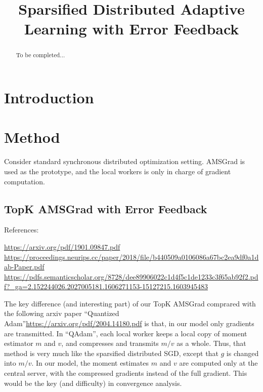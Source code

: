 \documentclass{article}
\begin{document}
\title{Sparsified Distributed Adaptive Learning with Error Feedback}


\date{}
\maketitle

\begin{abstract}
To be completed...
\end{abstract}

\section{Introduction}\label{sec:introduction}



\section{Method}\label{sec:main}

Consider standard synchronous distributed optimization setting. AMSGrad is used as the prototype, and the local workers is only in charge of gradient computation.


\subsection{TopK AMSGrad with Error Feedback}

References:

\url{https://arxiv.org/pdf/1901.09847.pdf}
\url{https://proceedings.neurips.cc/paper/2018/file/b440509a0106086a67bc2ea9df0a1dab-Paper.pdf}
\url{https://pdfs.semanticscholar.org/8728/dee89906022c1d4f5c1de1233c3f65ab92f2.pdf?_ga=2.152244026.2027005181.1606271153-15127215.1603945483}


The key difference (and interesting part) of our TopK AMSGrad comprared with the following arxiv paper ``Quantized Adam''\url{https://arxiv.org/pdf/2004.14180.pdf} is that, in our model only gradients are transmitted. In ``QAdam'', each local worker keeps a local copy of moment estimator $m$ and $v$, and compresses and transmits $m/v$ as a whole. Thus, that method is very much like the sparsified distributed SGD, except that $g$ is changed into $m/v$. In our model, the moment estimates $m$ and $v$ are computed only at the central server, with the compressed gradients instead of the full gradient. This would be the key (and difficulty) in convergence analysis.
\end{document}
